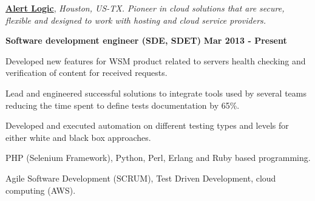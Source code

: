 

\href{http://alertlogic.com/}{\textbf{Alert Logic}}, \textit{Houston, US-TX.
Pioneer in cloud solutions that are secure, flexible and designed to work with
hosting and cloud service providers.}

\begin{outerlist}
\item[\FA \faAngleDoubleRight] \textbf{Software development engineer (SDE,
SDET)}
\hfill
\textbf{Mar 2013 - Present}
\end{outerlist}

    \begin{innerlist}
\item Developed new features for WSM product related to servers
health checking and verification of content for received requests.
\item Lead and engineered successful solutions to integrate tools
used by several teams reducing the time spent to define tests documentation by 65\%.
\item Developed and executed automation on different testing types and levels
for either white and black box approaches.
\item PHP (Selenium Framework), Python, Perl, Erlang and Ruby based programming.
\item Agile Software Development (SCRUM), Test Driven Development, cloud
computing (AWS).
    \end{innerlist}

